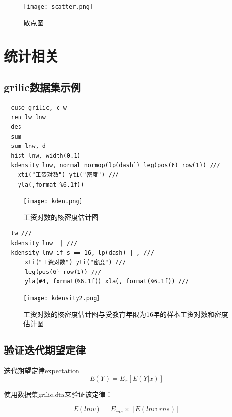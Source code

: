 \documentclass[cn,fancy,blue,11pt]{elegantbook}
\begin{document}
\begin{figure}[htbp]
  \centering \texttt{[image: scatter.png]}
  \caption{散点图}
  \label{fig:scatter}
\end{figure}

\section{统计相关}
\subsection{grilic数据集示例}
\begin{lstlisting}
  cuse grilic, c w
  ren lw lnw
  des
  sum
  sum lnw, d
  hist lnw, width(0.1)
  kdensity lnw, normal normop(lp(dash)) leg(pos(6) row(1)) ///
    xti("工资对数") yti("密度") ///
    yla(,format(%6.1f))
\end{lstlisting}

\begin{figure}[htbp]
  \centering \texttt{[image: kden.png]}
  \caption{工资对数的核密度估计图}\label{fig:kden}
\end{figure}

\begin{lstlisting}
  tw ///
  kdensity lnw || ///
  kdensity lnw if s == 16, lp(dash) ||, ///
      xti("工资对数") yti("密度") ///
      leg(pos(6) row(1)) ///
      yla(#4, format(%6.1f)) xla(, format(%6.1f)) ///
\end{lstlisting}

\begin{figure}[htbp]
  \centering \texttt{[image: kdensity2.png]}
  \caption{工资对数的核密度估计图与受教育年限为16年的样本工资对数和密度估计图}
  \label{fig:kden2}
\end{figure}

\subsection{验证迭代期望定律}

\begin{definition}{迭代期望定律}{expectation}
  \begin{equation}
    E(Y) = E_x[E(Y|x)]
  \end{equation}
\end{definition}

使用数据集grilic.dta来验证该定律：

\begin{equation}
  E(lnw) = E_{rns} \times [E(lnw|rns)]
\end{equation}
\end{document}
